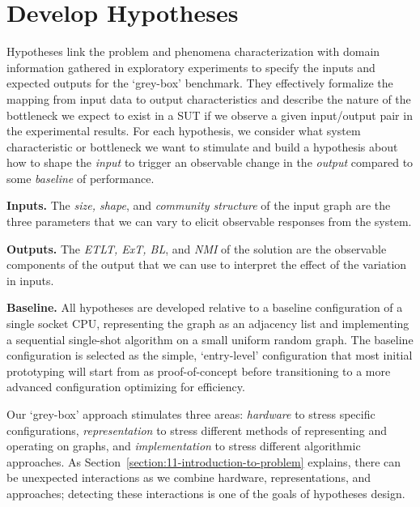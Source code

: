 \section{Develop Hypotheses}
\label{section:54-CD-Hypotheses}

Hypotheses link the problem and phenomena characterization with domain information gathered in exploratory experiments to specify the inputs and expected outputs for the `grey-box' benchmark. 
They effectively formalize the mapping from input data to output characteristics and describe the nature of the bottleneck we expect to exist in a \ac{SUT} if we observe a given input/output pair in the experimental results.
For each hypothesis, we consider what system characteristic or bottleneck we want to stimulate and build a hypothesis about how to shape the \textit{input} to trigger an observable change in the \textit{output} compared to some \textit{baseline} of performance.

\noindent \textbf{Inputs.}
The \textit{size, shape}, and \textit{community structure} of the input graph are the three parameters that we can vary to elicit observable responses from the system. 

\noindent \textbf{Outputs.}
The \textit{\ac{ETLT}, \ac{ExT}, \ac{BL}}, and \textit{NMI} of the solution are the observable components of the output that we can use to interpret the effect of the variation in inputs. 

\noindent \textbf{Baseline.}
All hypotheses are developed relative to a baseline configuration of a single socket \ac{CPU}, representing the graph as an adjacency list and implementing a sequential single-shot algorithm on a small uniform random graph. 
The baseline configuration is selected as the simple, `entry-level' configuration that most initial \gai prototyping will start from as proof-of-concept before transitioning to a more advanced configuration optimizing for efficiency. 

Our `grey-box' approach stimulates three areas: \textit{hardware} to stress specific configurations, \textit{representation} to stress different methods of representing and operating on graphs, and \textit{implementation} to stress different algorithmic approaches.
As Section~\ref{section:11-introduction-to-problem} explains, there can be unexpected interactions as we combine hardware, representations, and approaches; detecting these interactions is one of the goals of hypotheses design.


